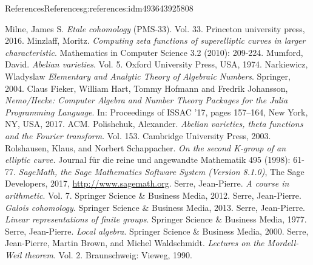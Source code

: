 \documentclass[oneside,10pt,]{book}
\numberwithin{equation}{section}
\begin{document}
\begin{references-chapter-numberless}{References}{}{References}{}{}{g:references:idm493643925808}
\begin{thebibliography}{9}
\hypertarget{x:biblio:bib-milne-etale}{}Milne, James S. \textit{Etale cohomology} (PMS-33). Vol. 33. Princeton university press, 2016.
\hypertarget{x:biblio:bib-minzlaff}{}Minzlaff, Moritz. \textit{Computing zeta functions of superelliptic curves in larger characteristic}. Mathematics in Computer Science 3.2 (2010): 209-224.
\hypertarget{x:biblio:bib-mumford-abvar}{}Mumford, David. \textit{Abelian varieties}. Vol. 5. Oxford University Press, USA, 1974.
\hypertarget{x:biblio:bib-narkiewicz}{}Narkiewicz, Wladyslaw  \textit{Elementary and Analytic Theory of Algebraic Numbers}. Springer, 2004.
\hypertarget{x:biblio:bib-nemo}{}Claus Fieker, William Hart, Tommy Hofmann and Fredrik Johansson, \textit{Nemo\slash{}Hecke: Computer Algebra and Number Theory Packages for the Julia Programming Language}. In: Proceedings of ISSAC '17, pages 157–164, New York, NY, USA, 2017. ACM.
\hypertarget{x:biblio:bib-polishchuck}{}Polishchuk, Alexander. \textit{Abelian varieties, theta functions and the Fourier transform}. Vol. 153. Cambridge University Press, 2003.
\hypertarget{x:biblio:bib-rolshausen}{}Rolshausen, Klaus, and Norbert Schappacher.  \textit{On the second K-group of an elliptic curve.}  Journal für die reine und angewandte Mathematik 495 (1998): 61-77.
\hypertarget{x:biblio:bib-sage}{}\textit{SageMath, the Sage Mathematics Software System (Version 8.1.0)}, The Sage Developers, 2017, \url{http://www.sagemath.org}.
\hypertarget{x:biblio:bib-serre-course}{}Serre, Jean-Pierre. \textit{A course in arithmetic}. Vol. 7. Springer Science \& Business Media, 2012.
\hypertarget{x:biblio:bib-serre-gal-coh}{}Serre, Jean-Pierre. \textit{Galois cohomology}. Springer Science \& Business Media, 2013.
\hypertarget{x:biblio:bib-serre-linear-reps}{}Serre, Jean-Pierre. \textit{Linear representations of finite groups}. Springer Science \& Business Media, 1977.
\hypertarget{x:biblio:bib-serre-local-alg}{}Serre, Jean-Pierre. \textit{Local algebra}. Springer Science \& Business Media, 2000.
\hypertarget{x:biblio:bib-serre-mordell-weil}{}Serre, Jean-Pierre, Martin Brown, and Michel Waldschmidt. \textit{Lectures on the Mordell-Weil theorem}. Vol. 2. Braunschweig: Vieweg, 1990.

\end{thebibliography}
\end{references-chapter-numberless}
\end{document}

